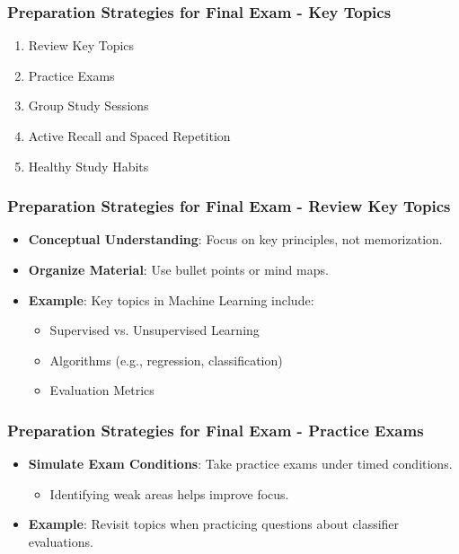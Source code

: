 \documentclass[aspectratio=169]{beamer}
\begin{document}
\begin{frame}[fragile]
    \frametitle{Preparation Strategies for Final Exam - Key Topics}
    \begin{enumerate}
        \item Review Key Topics
        \item Practice Exams
        \item Group Study Sessions
        \item Active Recall and Spaced Repetition
        \item Healthy Study Habits
    \end{enumerate}
\end{frame}

\begin{frame}[fragile]
    \frametitle{Preparation Strategies for Final Exam - Review Key Topics}
    \begin{itemize}
        \item \textbf{Conceptual Understanding}: Focus on key principles, not memorization.
        \item \textbf{Organize Material}: Use bullet points or mind maps.
        \item \textbf{Example}: Key topics in Machine Learning include:
        \begin{itemize}
            \item Supervised vs. Unsupervised Learning
            \item Algorithms (e.g., regression, classification)
            \item Evaluation Metrics
        \end{itemize}
    \end{itemize}
\end{frame}

\begin{frame}[fragile]
    \frametitle{Preparation Strategies for Final Exam - Practice Exams}
    \begin{itemize}
        \item \textbf{Simulate Exam Conditions}: Take practice exams under timed conditions.
            \begin{itemize}
                \item Identifying weak areas helps improve focus.
            \end{itemize}
        \item \textbf{Example}: Revisit topics when practicing questions about classifier evaluations.
    \end{itemize}
\end{frame}
\end{document}
